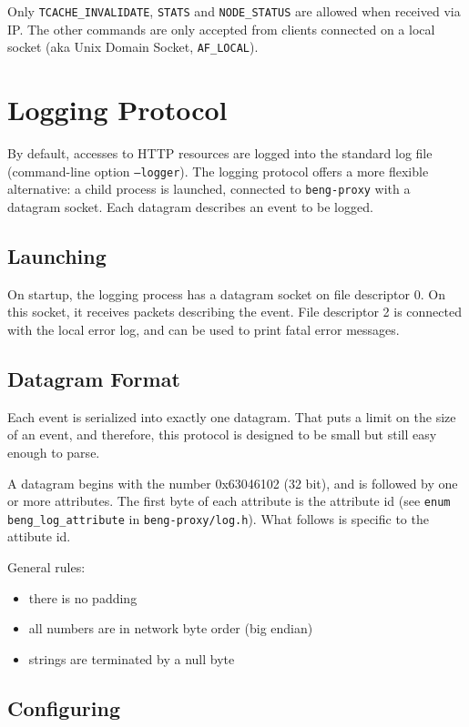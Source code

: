 \documentclass[a4paper,12pt]{article}
\begin{document}
Only \verb|TCACHE_INVALIDATE|, \verb|STATS| and \verb|NODE_STATUS| are
allowed when received via IP.  The other commands are only accepted
from clients connected on a local socket (aka Unix Domain Socket,
\verb|AF_LOCAL|).


\section{Logging Protocol}

By default, accesses to HTTP resources are logged into the standard
log file (command-line option \texttt{--logger}).  The logging
protocol offers a more flexible alternative: a child process is
launched, connected to \texttt{beng-proxy} with a datagram socket.
Each datagram describes an event to be logged.

\subsection{Launching}

On startup, the logging process has a datagram socket on file
descriptor 0.  On this socket, it receives packets describing the
event.  File descriptor 2 is connected with the local error log, and
can be used to print fatal error messages.

\subsection{Datagram Format}

Each event is serialized into exactly one datagram.  That puts a limit
on the size of an event, and therefore, this protocol is designed to
be small but still easy enough to parse.

A datagram begins with the number 0x63046102 (32 bit), and is followed
by one or more attributes.  The first byte of each attribute is the
attribute id (see \texttt{enum beng\_log\_attribute} in
\texttt{beng-proxy/log.h}).  What follows is specific to the attibute
id.

General rules:

\begin{itemize}
\item there is no padding
\item all numbers are in network byte order (big endian)
\item strings are terminated by a null byte
\end{itemize}

\subsection{Configuring}
\end{document}
